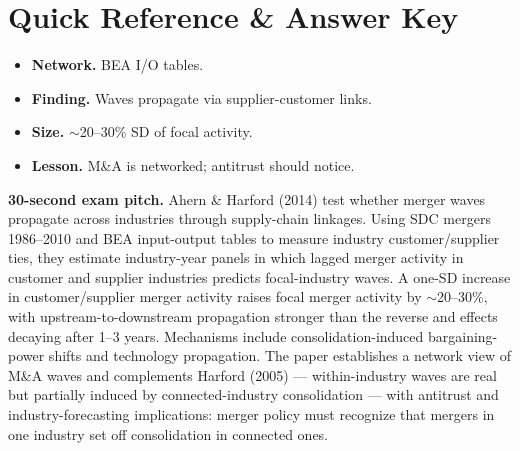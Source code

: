 \documentclass[11pt]{article}
\begin{document}
\section*{Quick Reference \& Answer Key}
\begin{answerbox}
\begin{itemize}
\item \textbf{Network.} BEA I/O tables.
\item \textbf{Finding.} Waves propagate via supplier-customer links.
\item \textbf{Size.} $\sim$20--30\% SD of focal activity.
\item \textbf{Lesson.} M\&A is networked; antitrust should notice.
\end{itemize}
\end{answerbox}

\begin{keybox}
\textbf{30-second exam pitch.} Ahern \& Harford (2014) test whether merger waves propagate across industries through supply-chain linkages. Using SDC mergers 1986--2010 and BEA input-output tables to measure industry customer/supplier ties, they estimate industry-year panels in which lagged merger activity in customer and supplier industries predicts focal-industry waves. A one-SD increase in customer/supplier merger activity raises focal merger activity by $\sim$20--30\%, with upstream-to-downstream propagation stronger than the reverse and effects decaying after 1--3 years. Mechanisms include consolidation-induced bargaining-power shifts and technology propagation. The paper establishes a network view of M\&A waves and complements Harford (2005) --- within-industry waves are real but partially induced by connected-industry consolidation --- with antitrust and industry-forecasting implications: merger policy must recognize that mergers in one industry set off consolidation in connected ones.
\end{keybox}
\end{document}
